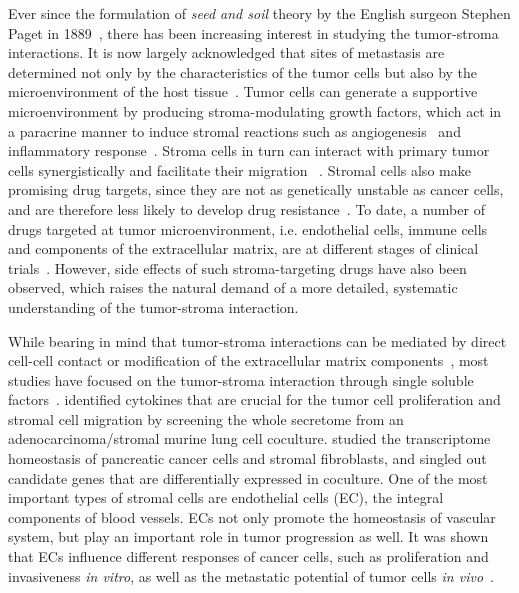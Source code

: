 Ever since the formulation of \emph{seed and soil} theory by the English 
surgeon Stephen Paget in 1889~\citep{Paget1889}, there has been increasing 
interest in studying the tumor-stroma interactions. 
It is now largely acknowledged that sites of metastasis are determined 
not only by the characteristics of the tumor
cells but also by the microenvironment of
the host tissue~\citep{Fidler2003}. Tumor cells can generate a supportive
microenvironment by producing stroma-modulating
growth factors, which act in a
paracrine manner to induce stromal reactions such as
angiogenesis~\citep{Bergers2003}
and inflammatory response~\citep{Coussens2002}. Stroma cells in turn can
interact with primary tumor cells synergistically and facilitate their migration~%
\citep{Wyckoff2004}.
Stromal cells also make promising drug targets, since they are not as 
genetically
unstable as cancer cells, and are therefore less likely to
develop drug resistance~\citep{Kerbel1997}. To date, a number of drugs targeted
at tumor microenvironment, i.e. endothelial cells, immune cells and components
of the extracellular matrix, are at different stages of clinical 
trials~\citep{Mueller2004}. However, side effects of such stroma-targeting drugs
have also been observed, which raises the natural demand of a more detailed, 
systematic understanding of the tumor-stroma interaction.

While bearing in mind that tumor-stroma interactions can be mediated by direct cell-cell contact or modification of the extracellular matrix
components~\citep{Micke2004a}, most studies have focused on the tumor-stroma interaction through
single soluble factors~\citep{Kryczek2007,Saijo2002i,Nakamura1997}. 
\cite{Zhong2008} identified cytokines that are crucial for the 
tumor cell proliferation
and stromal cell migration by screening the whole secretome from
an adenocarcinoma/stromal murine lung cell coculture.
\cite{Sato2004} studied
the transcriptome homeostasis of pancreatic
cancer cells and stromal fibroblasts,
and singled out candidate genes that are
differentially expressed in coculture.
One of the most important types of stromal cells are endothelial cells (EC), 
the integral components of blood vessels. ECs not only promote the homeostasis of 
vascular system, but play an important role in tumor progression as well. 
It was shown that ECs influence different responses of cancer cells, such as 
proliferation and invasiveness \emph{in vitro}, as well as the metastatic potential 
of tumor cells \emph{in vivo}~\citep{Franses2011}.

